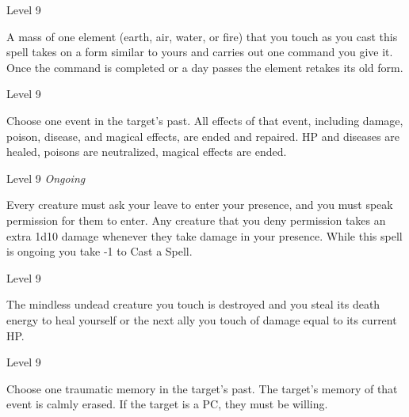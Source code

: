 \startSpellName
{} 	Level 9
\stopSpellName
 

A mass of one element (earth, air, water, or fire) that you touch as you cast this spell takes on a form similar to yours and carries out one command you give it. Once the command is completed or a day passes the element retakes its old form.

 
\startSpellName
{} 	Level 9
\stopSpellName
 

Choose one event in the target's past. All effects of that event, including damage, poison, disease, and magical effects, are ended and repaired. HP and diseases are healed, poisons are neutralized, magical effects are ended.

 
\startSpellName
{} 	Level 9	{\em Ongoing} 
\stopSpellName
 

Every creature must ask your leave to enter your presence, and you must speak permission for them to enter. Any creature that you deny permission takes an extra 1d10 damage whenever they take damage in your presence. While this spell is ongoing you take -1 to Cast a Spell.

 
\startSpellName
{} 	Level 9
\stopSpellName
 

The mindless undead creature you touch is destroyed and you steal its death energy to heal yourself or the next ally you touch of damage equal to its current HP.

 
\startSpellName
{} 	Level 9
\stopSpellName
 

Choose one traumatic memory in the target's past. The target's memory of that event is calmly erased. If the target is a PC, they must be willing.







 
